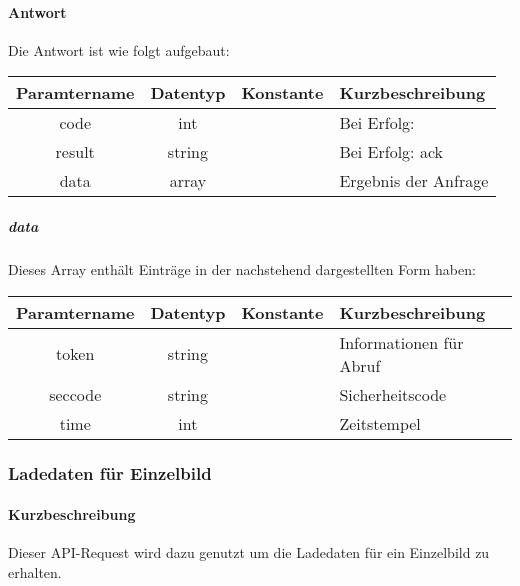 \paragraph{Antwort}Die Antwort ist wie folgt aufgebaut:
\begin{table}[H]
	\begin{tabular}{|c|c|c|p{6.5cm}|}
		\hline
		\textbf{Paramtername} & \textbf{Datentyp} & \textbf{Konstante} & \textbf{Kurzbeschreibung}            \\ \hline                
		code                & int              &                 & Bei Erfolg: {\glqq 0\grqq} \\ \hline
		result              & string           &                 & Bei Erfolg: {\glqq ack\grqq} \\ \hline
		data                & array            &                 & Ergebnis der Anfrage \\ \hline
	\end{tabular}
\end{table}
\subparagraph{data}Dieses Array enthält Einträge in der nachstehend dargestellten Form haben:
\begin{table}[H]
	\begin{tabular}{|c|c|c|p{6.5cm}|}
		\hline
		\textbf{Paramtername} & \textbf{Datentyp} & \textbf{Konstante} & \textbf{Kurzbeschreibung}    \\ \hline
		token              & string            &                 & Informationen für Abruf \\ \hline
		seccode            & string            &                 & Sicherheitscode \\ \hline
		time               & int               &                 & Zeitstempel \\ \hline
	\end{tabular}
\end{table}
\subsubsection{Ladedaten für Einzelbild}
\paragraph{Kurzbeschreibung}Dieser API-Request wird dazu genutzt um die Ladedaten für ein Einzelbild zu erhalten.
